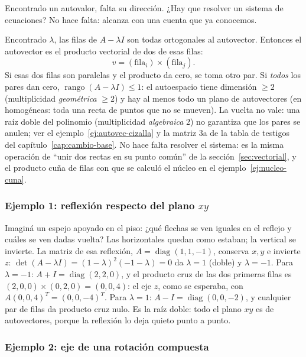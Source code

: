 Encontrado un autovalor, falta su dirección. ¿Hay que resolver un sistema de ecuaciones? No
hace falta: alcanza con una cuenta que ya conocemos.

\begin{idea}
Encontrado \(\lambda\), las filas de \(A-\lambda I\) son todas ortogonales al autovector.
Entonces el autovector es el producto vectorial de dos de esas filas:
\[
  v=(\text{fila}_i)\times(\text{fila}_j) .
\]
Si esas dos filas son paralelas y el producto da cero, se toma otro par. Si \emph{todos} los
pares dan cero, \(\operatorname{rango}(A-\lambda I)\le1\): el autoespacio tiene dimensión
\(\ge2\) (multiplicidad \emph{geométrica} \(\ge2\)) y hay al menos todo un plano de
autovectores (en homogéneas: toda una recta de puntos que no se mueven). La vuelta no vale: una raíz
doble del polinomio (multiplicidad \emph{algebraica} \(2\)) no garantiza que los pares se
anulen; ver el ejemplo~\ref{ej:autovec-cizalla} y la matriz 3a de la tabla de testigos del
capítulo~\ref{cap:cambio-base}. No hace falta resolver el sistema: es la misma operación de
\enquote{unir dos rectas en su punto común} de la sección~\ref{sec:vectorial},
y el producto cuña de filas con que se calculó el núcleo en el ejemplo~\ref{ej:nucleo-cuna}.
\end{idea}

\subsubsection{Ejemplo 1: reflexión respecto del plano \texorpdfstring{$xy$}{xy}}

Imaginá un espejo apoyado en el piso: ¿qué flechas se ven iguales en el reflejo y cuáles se
ven dadas vuelta? Las horizontales quedan como estaban; la vertical se invierte. La matriz de esa
reflexión, \(A=\operatorname{diag}(1,1,-1)\), conserva \(x,y\) e invierte \(z\):
\(\det(A-\lambda I)=(1-\lambda)^2(-1-\lambda)=0\) da \(\lambda=1\) (doble) y \(\lambda=-1\).
Para \(\lambda=-1\): \(A+I=\operatorname{diag}(2,2,0)\), y el producto cruz de las dos
primeras filas es \((2,0,0)\times(0,2,0)=(0,0,4)\): el eje \(z\), como se esperaba, con
\(A(0,0,4)^T=(0,0,-4)^T\). Para \(\lambda=1\): \(A-I=\operatorname{diag}(0,0,-2)\), y
cualquier par de filas da producto cruz nulo. Es la raíz doble: todo el plano \(xy\) es de
autovectores, porque la reflexión lo deja quieto punto a punto.

\subsubsection{Ejemplo 2: eje de una rotación compuesta}

